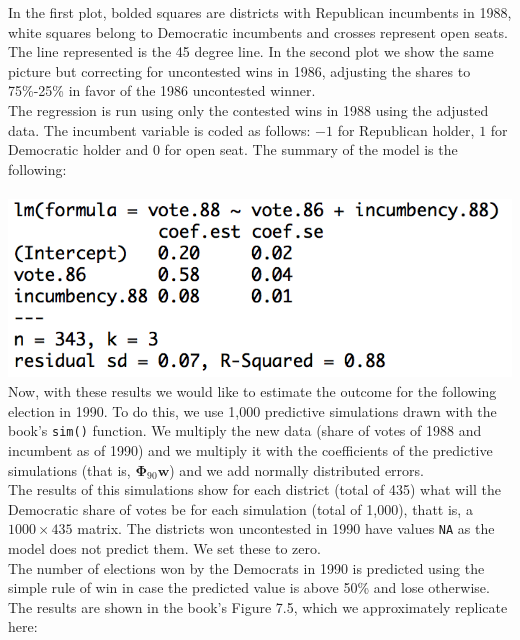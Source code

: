 \documentclass[a4paper, 11pt]{article}
\begin{document}
\begin{figure}[H]
\begin{subfigure}{.5\textwidth}
\end{subfigure}
\end{figure}
In the first plot, bolded squares are districts with Republican incumbents in 1988, white squares belong to Democratic incumbents and crosses represent open seats. The line represented is the 45 degree line. In the second plot we show the same picture but correcting for uncontested wins in 1986, adjusting the shares to 75\%-25\% in favor of the 1986 uncontested winner.\\
\newline The regression is run using only the contested wins in 1988 using the adjusted data. The incumbent variable is coded as follows: $-1$ for Republican holder, $1$ for Democratic holder and $0$ for open seat. The summary of the model is the following:\\
\newline \\
\includegraphics[scale=0.7]{plot_ex4_4.png}
\newline \\
\newline Now, with these results we would like to estimate the outcome for the following election in 1990. To do this, we use 1,000 predictive simulations drawn with the book's \texttt{sim()} function. We multiply the new data (share of votes of 1988 and incumbent as of 1990) and we multiply it with the coefficients of the predictive simulations (that is, $\mathbf{\Phi}_{90} \mathbf{w}$) and we add normally distributed errors.\\
\newline The results of this simulations show for each district (total of 435) what will the Democratic share of votes be for each simulation (total of 1,000), thatt is, a $1000 \times 435$ matrix. The districts won uncontested in 1990 have values \texttt{NA} as the model does not predict them. We set these to zero.\\
\newline The number of elections won by the Democrats in 1990 is predicted using the simple rule of win in case the predicted value is above 50\% and lose otherwise. The results are shown in the book's Figure 7.5, which we approximately replicate here:
\end{document}
